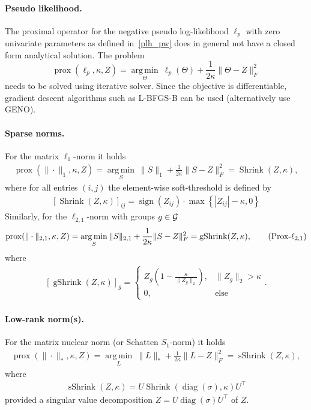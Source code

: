 \documentclass{article}
\newcommand{\bPc}[1]{\ensuremath{\left\{#1 \right\}}} %
\newcommand{\bPe}[1]{\ensuremath{\left[#1 \right]}} %
\DeclareMathOperator{\diag}{diag}
\DeclareMathOperator{\sign}{sign}
\DeclareMathOperator{\gshrink}{gShrink}
\DeclareMathOperator{\sshrink}{sShrink}
\DeclareMathOperator{\shrink}{Shrink}
\DeclareMathOperator{\argmin}{arg\,min}
\DeclareMathOperator{\prox}{prox}
\begin{document}
\paragraph{Pseudo likelihood.}
The proximal operator for the negative pseudo log-likelihood $\ell_p$ with zero univariate parameters as defined in~\eqref{plh_pw} does in general not have a closed form analytical solution.
The problem
\[\prox(\ell_p, \kappa, Z) = \underset{\Theta}{\argmin} \: \ell_p(\Theta) + \frac{1}{2\kappa}\|\Theta-Z\|_F^2\]
needs to be solved using iterative solver.
Since the objective is differentiable, gradient descent algorithms such as \textsc{L-BFGS-B} can be used (alternatively use \textsc{GENO}).


\paragraph{Sparse norms.}
For the matrix $\ell_1$-norm it holds
\begin{align}
\prox(\|\cdot\|_1, \kappa, Z) = \underset{S}{\argmin} \: \|S\|_1 + \frac{1}{2\kappa}\|S-Z\|_F^2 = \shrink(Z, \kappa), \tag{Prox-$\ell_1$}\label{prox_l1}
\end{align}
where for all entries $(i,j)$ the element-wise soft-threshold is defined by
\begin{align*}
\bPe{\shrink(Z, \kappa)}_{ij} = \sign (Z_{ij})\cdot \max \bPc{|Z_{ij}| -\kappa, 0}
\end{align*}
Similarly, for the $\ell_{2,1}$-norm with groups $g\in\mathcal{G}$
\begin{align}
\prox(\|\cdot\|_{2,1}, \kappa, Z) = \underset{S}{\argmin} \: \|S\|_{2,1} + \frac{1}{2\kappa}\|S-Z\|_F^2 = \gshrink(Z, \kappa), \tag{Prox-$\ell_{2,1}$}\label{prox_l21}
\end{align}
where
\begin{align*}
\bPe{\gshrink(Z, \kappa)}_{g} = \begin{cases} Z_g (1- \frac{\kappa}{\|Z_g\|_2}), & \|Z_g\|_2 > \kappa \\
0, & \text{else} \end{cases}.
\end{align*}

\paragraph{Low-rank norm(s).}
For the matrix nuclear norm (or Schatten $S_1$-norm) it holds
\begin{align}
\prox(\|\cdot\|_\ast, \kappa, Z) = \underset{L}{\argmin} \: \|L\|_\ast + \frac{1}{2\kappa}\|L-Z\|_F^2 = \sshrink(Z, \kappa), \tag{Prox-$S_1$} \label{prox_nuc}
\end{align}
where
\begin{align*}
\sshrink(Z, \kappa) = U \shrink(\diag(\sigma), \kappa) U^\top
\end{align*}
provided a singular value decomposition $Z = U \diag(\sigma) U^\top$ of $Z$.
\end{document}

